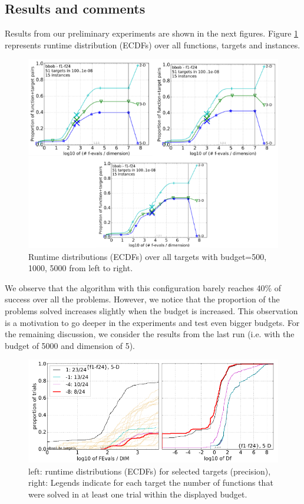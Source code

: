 \documentclass{article}
\begin{document}
\subsection{Results and comments}
Results from our preliminary experiments are shown in the next figures. Figure \ref{fig1} represents runtime distribution (ECDFs) over all functions, targets and instances.

\begin{figure}[H]
\begin{center} 
\includegraphics[scale=0.5]{figures/graphs1.png}
\caption{Runtime distributions (ECDFs) over all targets with budget=500, 1000, 5000 from left to right.}
\label{fig1}
\end{center}
\end{figure}

We observe that the algorithm with this configuration barely reaches 40\% of success over all the problems. However, we notice that the proportion of the problems solved increases slightly when the budget is increased. This observation is a motivation to go deeper in the experiments and test even bigger budgets. 
For the remaining discussion, we consider the results from the last run (i.e. with the budget of 5000 and dimension of 5).



\begin{figure}[H]
\begin{center} 
\includegraphics[scale=0.4]{figures/graphs2.png}
\caption{left: runtime distributions (ECDFs) for selected targets (precision), right: Legends indicate for each target the number of functions that were solved in at least one trial within the displayed budget.}
\label{fig2}
\end{center}
\end{figure}
\end{document}
